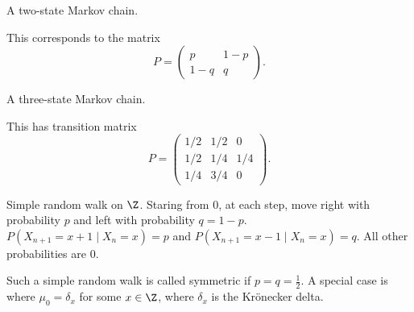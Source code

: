 \begin{examples}
    \item A two-state Markov chain.
    \begin{center}
    \end{center}
    This corresponds to the matrix \[
        P = \begin{pmatrix}
            p & 1-p \\
            1-q & q
        \end{pmatrix}.
    \]
    \item A three-state Markov chain.
    \begin{center}
    \end{center}
    This has transition matrix \[
        P = \begin{pmatrix}
            1/2 & 1/2 & 0 \\
            1/2 & 1/4 & 1/4 \\
            1/4 & 3/4 & 0
        \end{pmatrix}.
    \]
    \item Simple random walk on $\Z$.
    Staring from $0$, at each step, move right with probability $p$ and left
    with probability $q = 1-p$.
    $P(X_{n+1} = x + 1 \mid X_n = x) = p$ and
    $P(X_{n+1} = x - 1 \mid X_n = x) = q$.
    All other probabilities are $0$.

    Such a simple random walk is called symmetric if $p = q = \frac12$.
    A special case is where $\mu_0 = \delta_x$ for some $x \in \Z$, where
    $\delta_x$ is the Kr\"onecker delta.


\end{examples}
